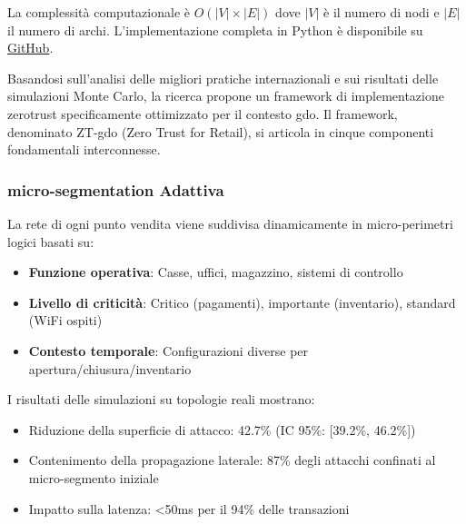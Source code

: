 La complessità computazionale è $O(|V| \times |E|)$ dove $|V|$ è il 
numero di nodi e $|E|$ il numero di archi. L'implementazione completa 
in Python è disponibile su \href{https://github.com/santoromarco74/gist-framework.git}{GitHub}.

Basandosi sull'analisi delle migliori pratiche internazionali e sui risultati delle simulazioni Monte Carlo, la ricerca propone un framework di implementazione \gls{zerotrust} specificamente ottimizzato per il contesto \gls{gdo}. Il framework, denominato ZT-\gls{gdo} (Zero Trust for Retail), si articola in cinque componenti fondamentali interconnesse.

\subsubsection{\texorpdfstring{\gls{micro-segmentation} Adattiva}{2.4.2.1 - Micro-segmentazione Adattiva}}

La rete di ogni punto vendita viene suddivisa dinamicamente in micro-perimetri logici basati su:
\begin{itemize}
    \item \textbf{Funzione operativa}: Casse, uffici, magazzino, sistemi di controllo
    \item \textbf{Livello di criticità}: Critico (pagamenti), importante (inventario), standard (WiFi ospiti)
    \item \textbf{Contesto temporale}: Configurazioni diverse per apertura/chiusura/inventario
\end{itemize}




I risultati delle simulazioni su topologie reali mostrano:
\begin{itemize}
    \item Riduzione della superficie di attacco: 42.7\% (IC 95\%: [39.2\%, 46.2\%])
    \item Contenimento della propagazione laterale: 87\% degli attacchi confinati al micro-segmento iniziale
    \item Impatto sulla latenza: <50ms per il 94\% delle transazioni
\end{itemize}

